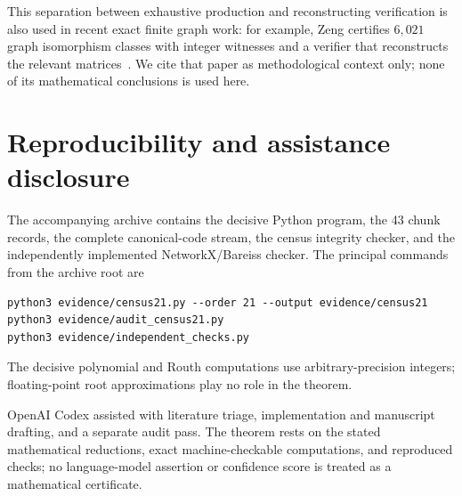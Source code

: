 \documentclass[11pt]{article}
\begin{document}
This separation between exhaustive production and reconstructing verification
is also used in recent exact finite graph work: for example, Zeng certifies
$6{,}021$ graph isomorphism classes with integer witnesses and a verifier that
reconstructs the relevant matrices~\cite{Zeng2026Whiskered}.  We cite that
paper as methodological context only; none of its mathematical conclusions is
used here.

\section*{Reproducibility and assistance disclosure}

The accompanying archive contains the decisive Python program, the 43 chunk
records, the complete canonical-code stream, the census integrity checker,
and the independently implemented NetworkX/Bareiss checker.  The principal
commands from the archive root are
\begin{verbatim}
python3 evidence/census21.py --order 21 --output evidence/census21
python3 evidence/audit_census21.py
python3 evidence/independent_checks.py
\end{verbatim}
The decisive polynomial and Routh computations use arbitrary-precision
integers; floating-point root approximations play no role in the theorem.

OpenAI Codex assisted with literature triage, implementation and manuscript
drafting, and a separate audit pass.  The theorem rests on the stated
mathematical reductions, exact machine-checkable computations, and reproduced
checks; no language-model assertion or confidence score is treated as a
mathematical certificate.



\end{document}
